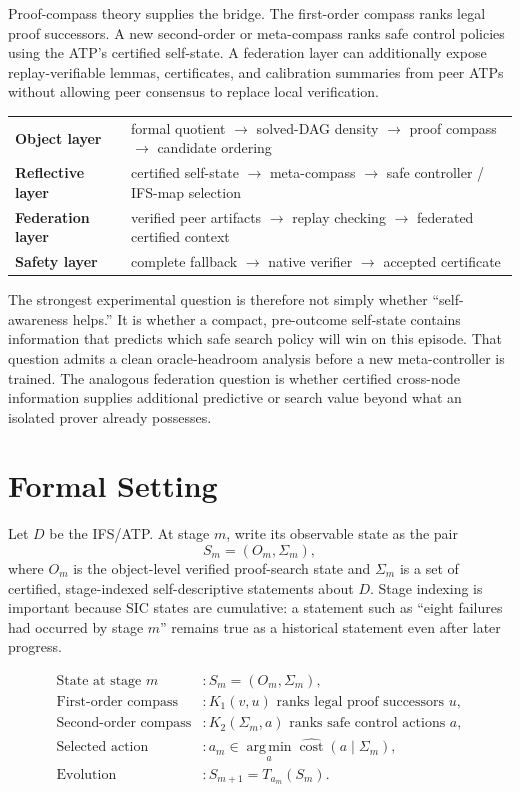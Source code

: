 \documentclass[11pt]{article}
\newcommand{\argmin}{\operatorname*{arg\,min}}
\begin{document}
Proof-compass theory supplies the bridge. The first-order compass ranks legal proof successors. A new second-order or meta-compass ranks safe control policies using the ATP's certified self-state. A federation layer can additionally expose replay-verifiable lemmas, certificates, and calibration summaries from peer ATPs without allowing peer consensus to replace local verification.

\begin{center}
\begin{tabularx}{0.96\textwidth}{>{\bfseries}p{} X}
\toprule
Object layer & formal quotient $\to$ solved-DAG density $\to$ proof compass $\to$ candidate ordering \\
Reflective layer & certified self-state $\to$ meta-compass $\to$ safe controller / IFS-map selection \\
Federation layer & verified peer artifacts $\to$ replay checking $\to$ federated certified context \\
Safety layer & complete fallback $\to$ native verifier $\to$ accepted certificate \\
\bottomrule
\end{tabularx}
\end{center}

The strongest experimental question is therefore not simply whether ``self-awareness helps.'' It is whether a compact, pre-outcome self-state contains information that predicts which safe search policy will win on this episode. That question admits a clean oracle-headroom analysis before a new meta-controller is trained. The analogous federation question is whether certified cross-node information supplies additional predictive or search value beyond what an isolated prover already possesses.

\section{Formal Setting}
Let $D$ be the IFS/ATP. At stage $m$, write its observable state as the pair
\[
S_m=(O_m,\Sigma_m),
\]
where $O_m$ is the object-level verified proof-search state and $\Sigma_m$ is a set of certified, stage-indexed self-descriptive statements about $D$. Stage indexing is important because SIC states are cumulative: a statement such as ``eight failures had occurred by stage $m$'' remains true as a historical statement even after later progress.

\begin{resultbox}
\begin{align*}
\text{State at stage }m &: S_m=(O_m,\Sigma_m),\\
\text{First-order compass} &: K_1(v,u) \text{ ranks legal proof successors }u,\\
\text{Second-order compass} &: K_2(\Sigma_m,a) \text{ ranks safe control actions }a,\\
\text{Selected action} &: a_m\in\argmin_a \widehat{\operatorname{cost}}(a\mid\Sigma_m),\\
\text{Evolution} &: S_{m+1}=T_{a_m}(S_m).
\end{align*}
\end{resultbox}
\end{document}
